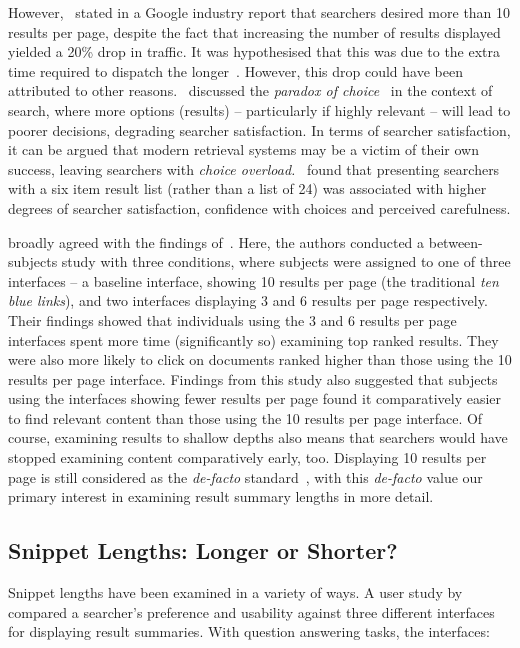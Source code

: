 However,~\cite{linden2006} stated in a Google industry report that searchers desired more than 10 results per page, despite the fact that increasing the number of results displayed yielded a 20\% drop in traffic. It was hypothesised that this was due to the extra time required to dispatch the longer~. However, this drop could have been attributed to other reasons.~\cite{oulasvirta2009serp_size} discussed the \emph{paradox of choice}~\citep{schwartz2005paradox_of_choice} in the context of search, where more options (results) -- particularly if highly relevant -- will lead to poorer decisions, degrading searcher satisfaction. In terms of searcher satisfaction, it can be argued that modern retrieval systems may be a victim of their own success, leaving searchers with \emph{choice overload.}~\cite{oulasvirta2009serp_size} found that presenting searchers with a six item result list (rather than a list of 24) was associated with higher degrees of searcher satisfaction, confidence with choices and perceived carefulness.

\cite{kelly2015serp_size} broadly agreed with the findings of~\cite{oulasvirta2009serp_size}. Here, the authors conducted a between-subjects study with three conditions, where subjects were assigned to one of three interfaces -- a baseline interface, showing 10 results per page (the traditional \emph{ten blue links}), and two interfaces displaying 3 and 6 results per page respectively. Their findings showed that individuals using the 3 and 6 results per page interfaces spent more time (significantly so) examining top ranked results. They were also more likely to click on documents ranked higher than those using the 10 results per page interface. Findings from this study also suggested that subjects using the interfaces showing fewer results per page found it comparatively easier to find relevant content than those using the 10 results per page interface. Of course, examining results to shallow depths also means that searchers would have stopped examining content comparatively early, too. Displaying 10 results per page is still considered as the \emph{de-facto} standard~\citep{hearst2009_search}, with this \emph{de-facto} value our primary interest in examining result summary lengths in more detail.

\subsection{Snippet Lengths: Longer or Shorter?}
Snippet lengths have been examined in a variety of ways. A user study by~\cite{paek2004wavelens} compared a searcher's preference and usability against three different interfaces for displaying result summaries. With question answering tasks, the interfaces:

